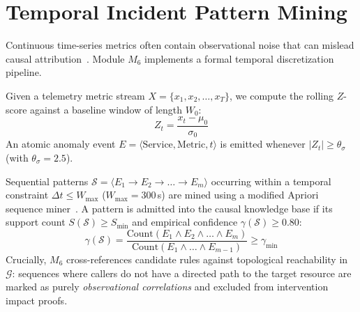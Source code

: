 \documentclass[conference]{IEEEtran}
\begin{document}
\section{Temporal Incident Pattern Mining}
Continuous time-series metrics often contain observational noise that can mislead causal attribution~\cite{li2022dejavu}. Module $M_6$ implements a formal temporal discretization pipeline.

Given a telemetry metric stream $X = \{x_1, x_2, \dots, x_T\}$, we compute the rolling $Z$-score against a baseline window of length $W_0$:
\begin{equation}
Z_t = \frac{x_t - \mu_{0}}{\sigma_{0}}
\end{equation}
An atomic anomaly event $E = \langle \text{Service}, \text{Metric}, t \rangle$ is emitted whenever $|Z_t| \ge \theta_\sigma$ (with $\theta_\sigma = 2.5$). 

Sequential patterns $\mathcal{S} = \langle E_1 \to E_2 \to \dots \to E_m \rangle$ occurring within a temporal constraint $\Delta t \le W_{\max}$ ($W_{\max} = 300$\,s) are mined using a modified Apriori sequence miner~\cite{van2002apriori}. A pattern is admitted into the causal knowledge base if its support count $S(\mathcal{S}) \ge S_{\min}$ and empirical confidence $\gamma(\mathcal{S}) \ge 0.80$:
\begin{equation}
\gamma(\mathcal{S}) = \frac{\text{Count}(E_1 \wedge E_2 \wedge \dots \wedge E_m)}{\text{Count}(E_1 \wedge \dots \wedge E_{m-1})} \ge \gamma_{\min}
\end{equation}
Crucially, $M_6$ cross-references candidate rules against topological reachability in $\mathcal{G}$: sequences where callers do not have a directed path to the target resource are marked as purely \textit{observational correlations} and excluded from intervention impact proofs.
\end{document}

